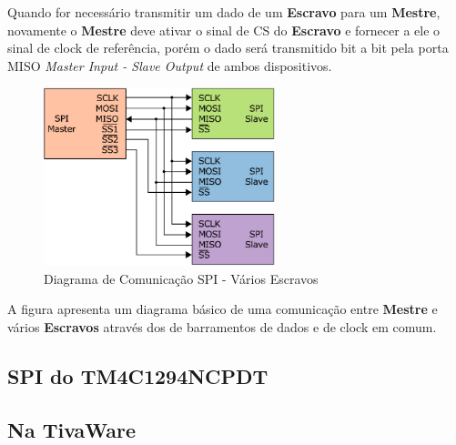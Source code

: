 Quando for necessário transmitir um dado de um  \textbf{Escravo} para um \textbf{Mestre}, novamente o \textbf{Mestre} deve ativar o sinal de CS do  \textbf{Escravo} e fornecer a ele o sinal de clock de referência, porém o dado será transmitido bit a bit pela porta MISO \emph{Master Input - Slave Output} de ambos dispositivos. 

\begin{figure}[H]
	\centering
	\includegraphics[width=0.6\textwidth] {figuras/BarramentoSPI.eps}
	\caption{Diagrama de Comunicação SPI - Vários Escravos}
	\label{fig:SPIDiagrama}
\end{figure}

A figura  \label{fig:SPIDiagrama} apresenta um diagrama básico de uma comunicação entre \textbf{Mestre} e vários \textbf{Escravos} através dos de barramentos de dados e de clock em comum.  

\subsection{SPI do TM4C1294NCPDT}


\subsection{Na TivaWare}